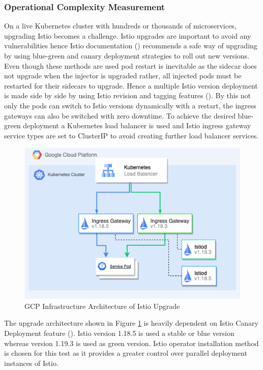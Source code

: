 \subsubsection{Operational Complexity Measurement}
On a live Kubernetes cluster with hundreds or thousands of microservices, upgrading Istio becomes a challenge. Istio upgrades are important to avoid any vulnerabilities hence Istio documentation (\cite{istioDocCanaryUpgrade}) recommends a safe way of upgrading by using blue-green and canary deployment strategies to roll out new versions. Even though these methods are used pod restart is inevitable as the sidecar does not upgrade when the injector is upgraded rather, all injected pods must be restarted for their sidecars to upgrade. Hence a multiple Istio version deployment is made side by side by using Istio revision and tagging features (\cite{postaIstio2021}). By this not only the pods can switch to Istio versions dynamically with a restart, the ingress gateways can also be switched with zero downtime. To achieve the desired blue-green deployment a Kubernetes load balancer is used and Istio ingress gateway service types are set to ClusterIP to avoid creating further load balancer services.

\begin{figure}[ht!]
  \centering
  \includegraphics[width=1.0\linewidth]{resources/istio-upgrade-strategy.drawio.png}
  \caption{GCP Infrastructure Architecture of Istio Upgrade}
  \label{method:istioUpgradeArch}
\end{figure}

The upgrade architecture shown in Figure \ref{method:istioUpgradeArch} is heavily dependent on Istio Canary Deployment feature (\cite{istioDocHelm}). Istio version 1.18.5 is used a stable or blue version whereas version 1.19.3 is used as green version. Istio operator installation method is chosen for this test as it provides a greater control over parallel deployment instances of Istio.

